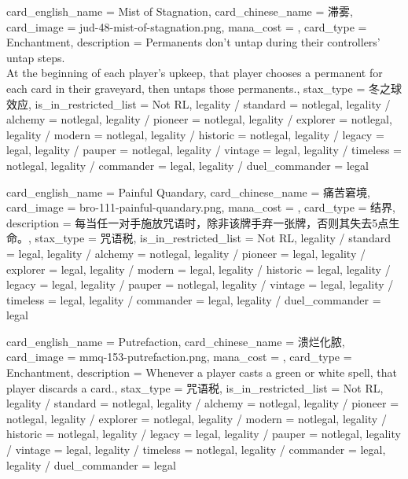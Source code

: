 \documentclass[lang = cn, color = black, 10pt]{AllThatStax}
\begin{document}
\card
{
	card_english_name = {Mist of Stagnation},
	card_chinese_name = {滞雾},
	card_image = jud-48-mist-of-stagnation.png,
	mana_cost = ,
	card_type = Enchantment,
	description = {Permanents don't untap during their controllers' untap steps.\\
		At the beginning of each player's upkeep, that player chooses a permanent for each card in their graveyard, then untaps those permanents.},
	stax_type = 冬之球效应,
	is_in_restricted_list = Not RL,
	legality / standard = notlegal,
	legality / alchemy = notlegal,
	legality / pioneer = notlegal,
	legality / explorer = notlegal,
	legality / modern = notlegal,
	legality / historic = notlegal,
	legality / legacy = legal,
	legality / pauper = notlegal,
	legality / vintage = legal,
	legality / timeless = notlegal,
	legality / commander = legal,
	legality / duel_commander = legal
}

\card
{
	card_english_name = {Painful Quandary},
	card_chinese_name = {痛苦窘境},
	card_image = bro-111-painful-quandary.png,
	mana_cost = ,
	card_type = 结界,
	description = {每当任一对手施放咒语时，除非该牌手弃一张牌，否则其失去5点生命。},
	stax_type = 咒语税,
	is_in_restricted_list = Not RL,
	legality / standard = legal,
	legality / alchemy = notlegal,
	legality / pioneer = legal,
	legality / explorer = legal,
	legality / modern = legal,
	legality / historic = legal,
	legality / legacy = legal,
	legality / pauper = notlegal,
	legality / vintage = legal,
	legality / timeless = legal,
	legality / commander = legal,
	legality / duel_commander = legal
}

\card
{
	card_english_name = {Putrefaction},
	card_chinese_name = {溃烂化脓},
	card_image = mmq-153-putrefaction.png,
	mana_cost = ,
	card_type = Enchantment,
	description = {Whenever a player casts a green or white spell, that player discards a card.},
	stax_type = 咒语税,
	is_in_restricted_list = Not RL,
	legality / standard = notlegal,
	legality / alchemy = notlegal,
	legality / pioneer = notlegal,
	legality / explorer = notlegal,
	legality / modern = notlegal,
	legality / historic = notlegal,
	legality / legacy = legal,
	legality / pauper = notlegal,
	legality / vintage = legal,
	legality / timeless = notlegal,
	legality / commander = legal,
	legality / duel_commander = legal
}
\end{document}
